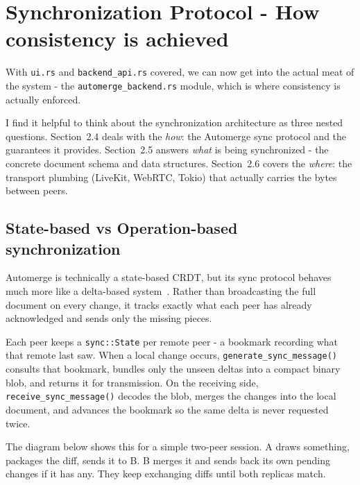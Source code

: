 \documentclass[a4paper,11pt,twoside]{report}
\theoremstyle{definition}
\begin{document}
\section{Synchronization Protocol - How consistency is achieved}


With \texttt{ui.rs} and \texttt{backend\_api.rs} covered, we can now get into the actual meat of the system - the \texttt{automerge\_backend.rs} module, which is where consistency is actually enforced.

I find it helpful to think about the synchronization architecture as three nested questions. Section~2.4 deals with the \emph{how}: the Automerge sync protocol and the guarantees it provides. Section~2.5 answers \emph{what} is being synchronized - the concrete document schema and data structures. Section~2.6 covers the \emph{where}: the transport plumbing (LiveKit, WebRTC, Tokio) that actually carries the bytes between peers.

\subsection{State-based vs Operation-based synchronization}

Automerge is technically a state-based CRDT, but its sync protocol behaves much more like a 
delta-based system~\cite{automerge-docs, shapiro-crdt}. Rather than broadcasting the full document on every change,
 it tracks exactly what each peer has already acknowledged and sends only the missing pieces.

Each peer keeps a \texttt{sync::State} per remote peer - a bookmark recording what that remote last saw.
 When a local change occurs, \texttt{generate\_sync\_message()} consults that bookmark, bundles only
  the unseen deltas into a compact binary blob, and returns it for transmission. 
  On the receiving side, \texttt{receive\_sync\_message()} decodes the blob, merges the changes 
  into the local document, and advances the bookmark so the same delta is never requested twice.

The diagram below shows this for a simple two-peer session. A draws something, packages the diff, 
sends it to B. B merges it and sends back its own pending changes if it has any. They keep
 exchanging diffs until both replicas match.
\end{document}
